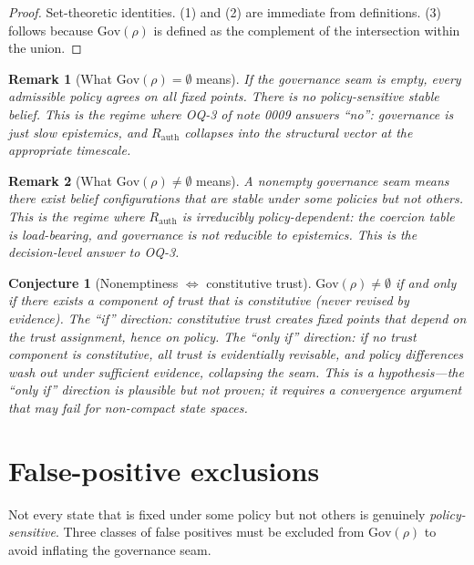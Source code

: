 \documentclass[11pt]{article}
\newtheorem{conjecture}{Conjecture}
\newtheorem{remark}{Remark}
\newcommand{\Gov}{\mathrm{Gov}}
\newcommand{\Rauth}{R_{\mathrm{auth}}}
\begin{document}
\begin{proof}
Set-theoretic identities. (1) and (2) are immediate from definitions. (3) follows because
$\Gov(\rho)$ is defined as the complement of the intersection within the union.
\end{proof}

\begin{remark}[What $\Gov(\rho) = \emptyset$ means]
If the governance seam is empty, every admissible policy agrees on all fixed points. There is
no policy-sensitive stable belief. This is the regime where OQ-3 of note 0009 answers
``no'': governance is just slow epistemics, and $\Rauth$ collapses into the structural vector
at the appropriate timescale.
\end{remark}

\begin{remark}[What $\Gov(\rho) \neq \emptyset$ means]
A nonempty governance seam means there exist belief configurations that are stable under some
policies but not others. This is the regime where $\Rauth$ is irreducibly policy-dependent: the
coercion table is load-bearing, and governance is not reducible to epistemics. This is the
\emph{decision}-level answer to OQ-3.
\end{remark}

\begin{conjecture}[Nonemptiness $\Leftrightarrow$ constitutive trust]
\label{conj:nonempty-constitutive}
$\Gov(\rho) \neq \emptyset$ if and only if there exists a component of trust that is
constitutive (never revised by evidence). The ``if'' direction: constitutive trust creates
fixed points that depend on the trust assignment, hence on policy. The ``only if'' direction:
if no trust component is constitutive, all trust is evidentially revisable, and policy
differences wash out under sufficient evidence, collapsing the seam. This is a
\emph{hypothesis}---the ``only if'' direction is plausible but not proven; it requires
a convergence argument that may fail for non-compact state spaces.
\end{conjecture}

\section{False-positive exclusions}
\label{sec:false-positives}

Not every state that is fixed under some policy but not others is genuinely
\emph{policy-sensitive}. Three classes of false positives must be excluded from $\Gov(\rho)$
to avoid inflating the governance seam.
\end{document}
